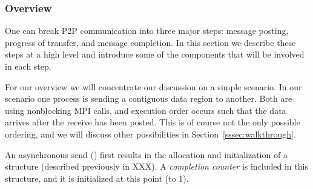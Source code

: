 \subsubsection{Overview}

% 
% 
% 

One can break P2P communication into three major steps: message
posting, progress of transfer, and message completion.  In this section we
describe these steps at a high level and introduce some of the components that
will be involved in each step.

% 

For our overview we will concentrate our discussion on a simple scenario.  In
our scenario one process is sending a contiguous data region to another.  Both
are using nonblocking MPI calls, and execution order occurs such that the data
arrives after the receive has been posted.  This is of course not the only
possible ordering, and we will discuss other possibilities in
Section~\ref{sssec:walkthrough}.

\begin{comment}
  \emph{include a figure showing the actual code snippets?  definitely.}
\end{comment}


An asynchronous send () first results in the allocation and
initialization of a  structure (described previously in
XXX).  A \emph{completion counter} is included in this structure, and it is
initialized at this point (to 1).
%

\begin{comment}
  \emph{is it a MPI_Request structure or a MPID_Request structure?  are
  \texttt{MPI_Request}s just references to \texttt{MPID_Request}s?}
\end{comment}

